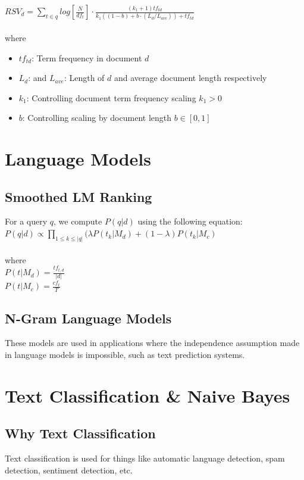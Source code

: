 \documentclass{article}%
\begin{document}
$RSV_d = \sum\limits_{t \in q} log \left[ \frac{N}{df_t} \right] \cdot \frac{(k_1 + 1) tf_{td}}{k_1 ((1 - b) + b \cdot (L_d /L_{ave})) + tf_{td}}$ \\
\\
where
\begin{itemize}
    \item $tf_{td}$: Term frequency in document $d$
    \item $L_d$: and $L_{ave}$: Length of $d$ and average document length respectively
    \item $k_1$: Controlling document term frequency scaling $k_1 > 0$
    \item $b$: Controlling scaling by document length $b \in [0, 1]$
\end{itemize}

\section*{Language Models}
\subsection*{Smoothed LM Ranking}
For a query $q$, we compute $P(q | d)$ using the following equation: \\

$P(q | d) \propto \prod\limits_{1 \leq k \leq |q|}(\lambda P(t_k | M_d) + (1 - \lambda) P(t_k | M_c)$ \\
\\
where \\

$P(t | M_d) = \frac{tf_{t,d}}{|d|}$ \\

$P(t | M_c) = \frac{cf_t}{T}$
\subsection*{N-Gram Language Models}
These models are used in applications where the independence assumption made in language models is impossible, such as text prediction systems.
\section*{Text Classification \& Naive Bayes}
\subsection*{Why Text Classification}
Text classification is used for things like automatic language detection, spam detection, sentiment detection, etc.
\end{document}
